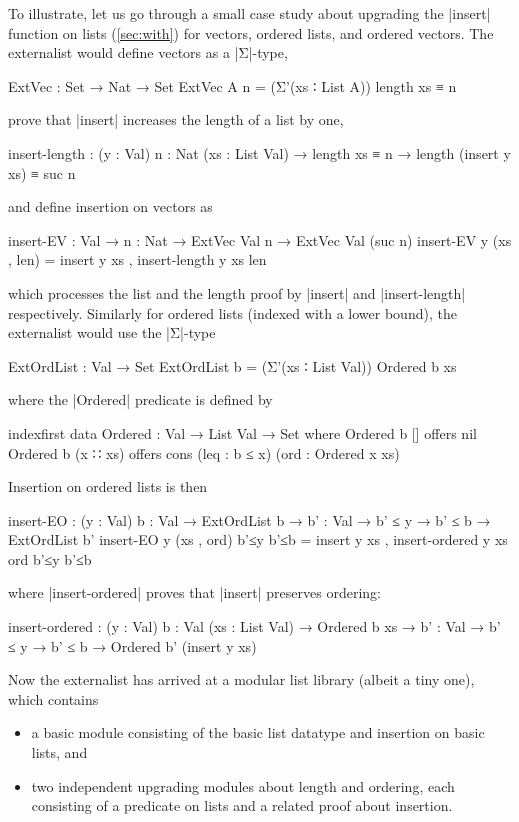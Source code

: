 To illustrate, let us go through a small case study about upgrading the |insert| function on lists (\autoref{sec:with}) for vectors, ordered lists, and ordered vectors.
The externalist would define vectors as a |Σ|-type,
\begin{code}
ExtVec : Set → Nat → Set
ExtVec A n = (Σ'(xs ∶ List A)) length xs ≡ n
\end{code}
prove that |insert| increases the length of a list by one,
\begin{code}
insert-length :  (y : Val) {n : Nat} (xs : List Val) →
                 length xs ≡ n → length (insert y xs) ≡ suc n
\end{code}
and define insertion on vectors as
\begin{code}
insert-EV : Val → {n : Nat} → ExtVec Val n → ExtVec Val (suc n)
insert-EV y (xs , len) = insert y xs , insert-length y xs len
\end{code}
which processes the list and the length proof by |insert| and |insert-length| respectively.
Similarly for ordered lists (indexed with a lower bound), the externalist would use the |Σ|-type
\begin{code}
ExtOrdList : Val → Set
ExtOrdList b = (Σ'(xs ∶ List Val)) Ordered b xs
\end{code}
where the |Ordered| predicate is defined by
\begin{code}
indexfirst data Ordered : Val → List Val → Set where
  Ordered b []        offers nil
  Ordered b (x ∷ xs)  offers cons (leq : b ≤ x) (ord : Ordered x xs)
\end{code}
Insertion on ordered lists is then
\begin{code}
insert-EO :  (y : Val) {b : Val} → ExtOrdList b →
             {b' : Val} → b' ≤ y → b' ≤ b → ExtOrdList b'
insert-EO y (xs , ord) b'≤y b'≤b = insert y xs , insert-ordered y xs ord b'≤y b'≤b
\end{code}
where |insert-ordered| proves that |insert| preserves ordering:
\begin{code}
insert-ordered :  (y : Val) {b : Val} (xs : List Val) → Ordered b xs →
                  {b' : Val} → b' ≤ y → b' ≤ b → Ordered b' (insert y xs)
\end{code}
Now the externalist has arrived at a modular list library (albeit a tiny one), which contains
\begin{itemize}
\item a basic module consisting of the basic list datatype and insertion on basic lists, and
\item two independent upgrading modules about length and ordering, each consisting of a predicate on lists and a related proof about insertion.
\end{itemize}
